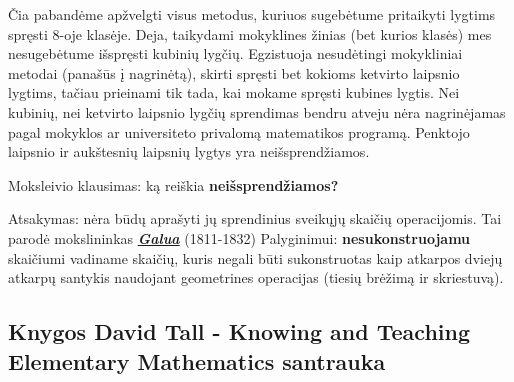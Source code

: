 \documentclass{article}
\begin{document}
Čia pabandėme apžvelgti visus metodus, kuriuos sugebėtume pritaikyti lygtims spręsti 8-oje klasėje. Deja, taikydami mokyklines žinias (bet kurios klasės) mes nesugebėtume išspręsti kubinių lygčių. Egzistuoja nesudėtingi mokykliniai metodai (panašūs į nagrinėtą), skirti spręsti bet kokioms ketvirto laipsnio lygtims, tačiau prieinami tik tada, kai mokame spręsti kubines lygtis. Nei kubinių, nei ketvirto laipsnio lygčių sprendimas bendru atveju nėra nagrinėjamas pagal mokyklos ar universiteto privalomą matematikos programą. Penktojo laipsnio ir aukštesnių laipsnių lygtys yra neišsprendžiamos.

Moksleivio klausimas: ką reiškia \textbf{neišsprendžiamos?}

Atsakymas: nėra būdų aprašyti jų sprendinius sveikųjų skaičių operacijomis. Tai parodė mokslininkas \href{http://www.vartiklis.lt/science/math/galois.htm}{\textbf{\textit{Galua}}} (1811-1832) Palyginimui: \textbf{nesukonstruojamu} skaičiumi vadiname skaičių, kuris negali būti sukonstruotas kaip atkarpos dviejų atkarpų santykis naudojant geometrines operacijas (tiesių brėžimą ir skriestuvą).


\subsection{Knygos David Tall - Knowing and Teaching Elementary Mathematics santrauka}
\end{document}
